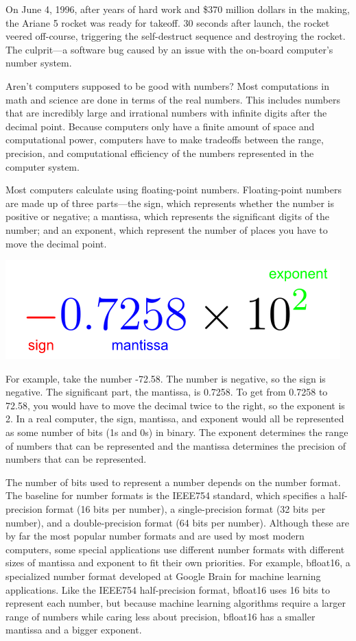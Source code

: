 \documentclass[11pt]{article}
\begin{document}
On June 4, 1996, after years of hard work and \$370 million dollars in the
  making, the Ariane 5 rocket was ready for takeoff.
30 seconds after launch, the rocket veered off-course, triggering the
  self-destruct sequence and destroying the rocket.
The culprit---a software bug caused by an issue with the on-board computer’s
  number system.

Aren’t computers supposed to be good with numbers? 
Most computations in math and science are done in terms of the real numbers.
This includes numbers that are incredibly large and irrational numbers with
infinite digits after the decimal point.
Because computers only have a finite amount of space and computational power,
computers have to make tradeoffs between the range, precision, and computational
efficiency of the numbers represented in the computer system.

Most computers calculate using floating-point numbers.
Floating-point numbers are made up of three parts—the sign, which represents
  whether the number is positive or negative; a mantissa, which represents the
  significant digits of the number; and an exponent, which represent the number
  of places you have to move the decimal point.

\includegraphics{floatingpointexample}

For example, take the number -72.58.
The number is negative, so the sign is negative.
The significant part, the mantissa, is 0.7258.
To get from 0.7258 to 72.58, you would have to move the decimal twice to the
  right, so the exponent is 2.
In a real computer, the sign, mantissa, and exponent would all be represented as some 
  number of bits (1s and 0s) in binary.
The exponent determines the range of numbers that can be represented and the
  mantissa determines the precision of numbers that can be represented.

The number of bits used to represent a number depends on the number format.
The baseline for number formats is the IEEE754 standard, which specifies a 
  half-precision format (16 bits per number), a single-precision format (32 bits per number),
  and a double-precision format (64 bits per number).
Although these are by far the most popular number formats and are used by most 
  modern computers, some special applications use different number formats 
  with different sizes of mantissa and exponent to fit their own
  priorities.
For example, bfloat16, a specialized number format developed at Google Brain for
  machine learning applications.
Like the IEEE754 half-precision format, bfloat16 uses 16 bits to represent
  each number, but because machine learning algorithms require a larger range
  of numbers while caring less about precision, bfloat16 has a smaller mantissa
  and a bigger exponent.
\end{document}
